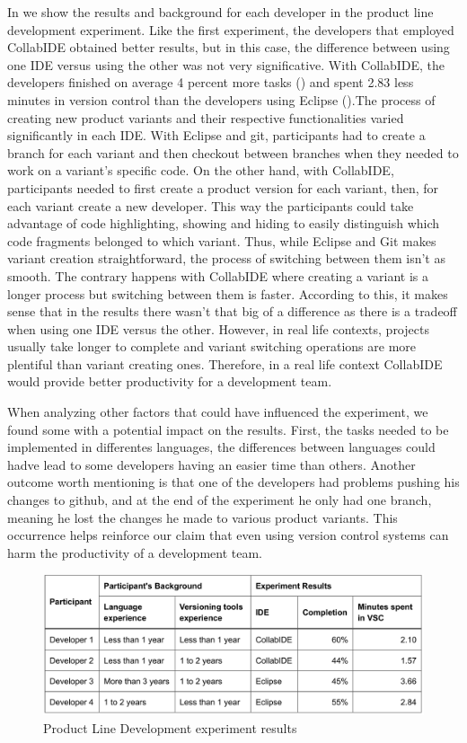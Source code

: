 In  we show the results and background for each developer in the product line development experiment. Like the first experiment, the developers that employed CollabIDE obtained better results, but in this case, the difference between using one IDE versus using the other was not very significative. With CollabIDE, the developers finished on average 4 percent more tasks () and spent 2.83 less minutes in version control than the developers using Eclipse ().The process of creating new product variants and their respective functionalities varied significantly in each IDE. With Eclipse and git, participants had to create a branch for each variant and then checkout between branches when they needed to work on a variant’s specific code. On the other hand, with CollabIDE, participants needed to first create a product version for each variant, then, for each variant create a new developer. This way the participants could take advantage of code highlighting, showing and hiding to easily distinguish which code fragments belonged to which variant. Thus, while Eclipse and Git makes variant creation straightforward, the process of switching between them isn’t as smooth. The contrary happens with CollabIDE where creating a variant is a longer process but switching between them is faster. According to this, it makes sense that in the results there wasn’t that big of a difference as there is a tradeoff when using one IDE versus the other. However, in real life contexts, projects usually take longer to complete and variant switching operations are more plentiful than variant creating ones. Therefore, in a real life context CollabIDE would provide better productivity for a development team.


When analyzing other factors that could have influenced the experiment, we found some with a potential impact on the results. First, the tasks needed to be implemented in differentes languages, the differences between languages could hadve lead to some developers having an easier time than others. Another outcome worth mentioning is that one of the developers had problems pushing his changes to github, and at the end of the experiment he only had one branch, meaning he lost the changes he made to various product variants. This occurrence helps reinforce our claim that even using version control systems can harm the productivity of a development team.   
\begin{figure}[htbp]
  \centering
  \includegraphics[width=1\textwidth]{img/resultsTableProductLine}
  \caption{Product Line Development experiment results}
  \label{fig:resultsTableProductLine}
\end{figure}

